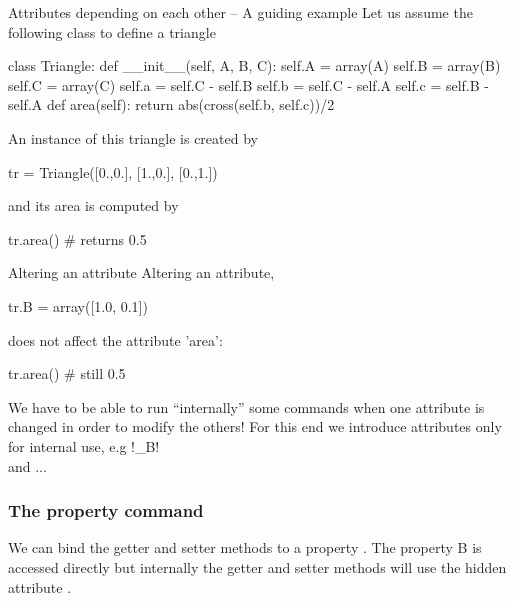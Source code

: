 \documentclass[hyperref={pdfpagelabels=false},table]{beamer}
\begin{document}
\begin{frame}[fragile]{Attributes depending on each other -- A guiding example}
Let us assume the following class to define a triangle
\begin{python}
class Triangle:
    def __init__(self, A, B, C):
        self.A = array(A)
        self.B = array(B)
        self.C = array(C)
        self.a = self.C - self.B
        self.b = self.C - self.A
        self.c = self.B - self.A
    def area(self):
        return abs(cross(self.b, self.c))/2
\end{python}
An instance of this triangle is created by
\begin{python}
tr = Triangle([0.,0.], [1.,0.], [0.,1.])
\end{python}
and its area is computed by
\begin{python}
tr.area() # returns 0.5
\end{python}
\end{frame}
\begin{frame}[fragile]{Altering an attribute}
Altering an attribute,
\begin{python}
tr.B = array([1.0, 0.1])
\end{python}
does not affect the attribute 'area':
\begin{python}
tr.area() # still 0.5
\end{python}
We have to be able to run ``internally'' some commands when one attribute is
changed in order to modify the others!
\vfill
For this end we introduce attributes only for internal use, e.g \pyth!_B! \\
and ...
\end{frame}

\begin{frame}\frametitle{The property command}

We can bind the getter and setter methods to a property . 
The property B is accessed directly but internally the getter and setter 
methods will use the hidden attribute .

\end{frame}

\end{document}

